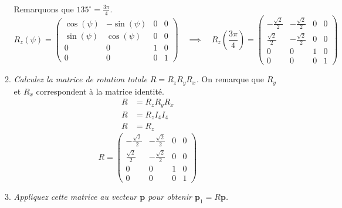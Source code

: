\documentclass[a4paper,12pt]{article}
\begin{document}
\begin{enumerate}
\begin{enumerate}
              Remarquons que \(135^\circ = \frac{3 \pi}{4} \).
              \begin{equation}
              R_z(\psi) = 
              \begin{pmatrix}
              \cos(\psi) & -\sin(\psi) & 0 & 0 \\
              \sin(\psi) & \cos(\psi) & 0 & 0 \\
              0 & 0 & 1 & 0 \\
              0 & 0 & 0 & 1
              \end{pmatrix}
              \quad \implies \quad
              \boxed{R_z(\frac{3 \pi}{4}) = 
              \begin{pmatrix}
              -\frac{\sqrt{2}}{2} & -\frac{\sqrt{2}}{2} & 0 & 0 \\
              \frac{\sqrt{2}}{2} & -\frac{\sqrt{2}}{2} & 0 & 0 \\
              0 & 0 & 1 & 0 \\
              0 & 0 & 0 & 1
              \end{pmatrix}}
              \end{equation}
              \item \emph{Calculez la matrice de rotation totale $R = R_z R_y R_x$.} \newline \newline
              On remarque que \(R_y\) et \(R_x\) correspondent à la matrice identité.
              \begin{align}
              R &= R_z R_y R_x \\
              R &= R_z I_4 I_4 \\ 
              R &= R_z
              \end{align}
              \begin{equation}
              \boxed{R = 
              \begin{pmatrix}
              -\frac{\sqrt{2}}{2} & -\frac{\sqrt{2}}{2} & 0 & 0 \\
              \frac{\sqrt{2}}{2} & -\frac{\sqrt{2}}{2} & 0 & 0 \\
              0 & 0 & 1 & 0 \\
              0 & 0 & 0 & 1
              \end{pmatrix}}
              \end{equation}
              \item \emph{Appliquez cette matrice au vecteur $\mathbf{p}$ pour obtenir $\mathbf{p}_1 = R \mathbf{p}$.}
              \begin{equation}

\end{equation}
\end{enumerate}
\end{enumerate}
\end{document}

